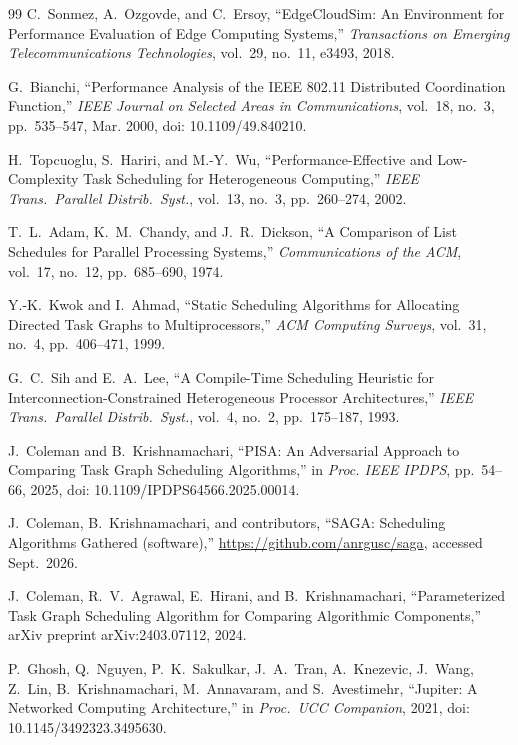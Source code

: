 \documentclass[conference]{IEEEtran}
\begin{document}
\begin{thebibliography}{99}
C.~Sonmez, A.~Ozgovde, and C.~Ersoy,
``EdgeCloudSim: An Environment for Performance Evaluation of Edge Computing
Systems,''
\emph{Transactions on Emerging Telecommunications Technologies},
vol.~29, no.~11, e3493, 2018.

G.~Bianchi,
``Performance Analysis of the IEEE 802.11 Distributed Coordination Function,''
\emph{IEEE Journal on Selected Areas in Communications},
vol.~18, no.~3, pp.~535--547, Mar. 2000, doi: 10.1109/49.840210.

H.~Topcuoglu, S.~Hariri, and M.-Y.~Wu,
``Performance-Effective and Low-Complexity Task Scheduling for Heterogeneous
Computing,''
\emph{IEEE Trans.\ Parallel Distrib.\ Syst.},
vol.~13, no.~3, pp.~260--274, 2002.

T.~L.~Adam, K.~M.~Chandy, and J.~R.~Dickson,
``A Comparison of List Schedules for Parallel Processing Systems,''
\emph{Communications of the ACM},
vol.~17, no.~12, pp.~685--690, 1974.

Y.-K.~Kwok and I.~Ahmad,
``Static Scheduling Algorithms for Allocating Directed Task Graphs to
Multiprocessors,''
\emph{ACM Computing Surveys},
vol.~31, no.~4, pp.~406--471, 1999.

G.~C.~Sih and E.~A.~Lee,
``A Compile-Time Scheduling Heuristic for Interconnection-Constrained
Heterogeneous Processor Architectures,''
\emph{IEEE Trans.\ Parallel Distrib.\ Syst.},
vol.~4, no.~2, pp.~175--187, 1993.

J.~Coleman and B.~Krishnamachari,
``PISA: An Adversarial Approach to Comparing Task Graph Scheduling Algorithms,''
in \emph{Proc. IEEE IPDPS}, pp.~54--66, 2025,
doi: 10.1109/IPDPS64566.2025.00014.

J.~Coleman, B.~Krishnamachari, and contributors,
``{SAGA}: Scheduling Algorithms Gathered (software),''
\url{https://github.com/anrgusc/saga}, accessed Sept.~2026.

J.~Coleman, R.~V.~Agrawal, E.~Hirani, and B.~Krishnamachari,
``Parameterized Task Graph Scheduling Algorithm for Comparing Algorithmic
Components,''
arXiv preprint arXiv:2403.07112, 2024.

P.~Ghosh, Q.~Nguyen, P.~K.~Sakulkar, J.~A.~Tran, A.~Knezevic, J.~Wang,
Z.~Lin, B.~Krishnamachari, M.~Annavaram, and S.~Avestimehr,
``Jupiter: A Networked Computing Architecture,''
in \emph{Proc.\ UCC Companion}, 2021, doi: 10.1145/3492323.3495630.


\end{thebibliography}
\end{document}
